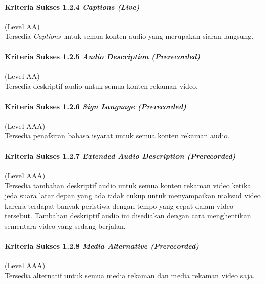 \paragraph{Kriteria Sukses 1.2.4 \textit{Captions (Live)}}
\label{sec:kriteria_sukses_1.2.4}
(Level AA)\\

Tersedia \textit{Captions} untuk semua konten audio yang merupakan siaran langsung.

\paragraph{Kriteria Sukses 1.2.5 \textit{Audio Description (Prerecorded)}}
\label{sec:kriteria_sukses_1.2.5}
(Level AA)\\

Tersedia deskriptif audio untuk semua konten rekaman video.

\paragraph{Kriteria Sukses 1.2.6 \textit{Sign Language (Prerecorded)}}
\label{sec:kriteria_sukses_1.2.6}
(Level AAA)\\

Tersedia penafsiran bahasa isyarat untuk semua konten rekaman audio. 

\paragraph{Kriteria Sukses 1.2.7 \textit{Extended Audio Description (Prerecorded)}}
\label{sec:kriteria_sukses_1.2.7}
(Level AAA)\\

Tersedia tambahan deskriptif audio untuk semua konten rekaman video ketika jeda suara latar depan yang ada tidak cukup untuk menyampaikan maksud video karena terdapat banyak peristiwa dengan tempo yang cepat dalam video tersebut. Tambahan deskriptif audio ini disediakan dengan cara menghentikan sementara video yang sedang berjalan.

\paragraph{Kriteria Sukses 1.2.8 \textit{Media Alternative (Prerecorded)}}
\label{sec:kriteria_sukses_1.2.8}
(Level AAA)\\

Tersedia alternatif untuk semua media rekaman dan media rekaman video saja.

